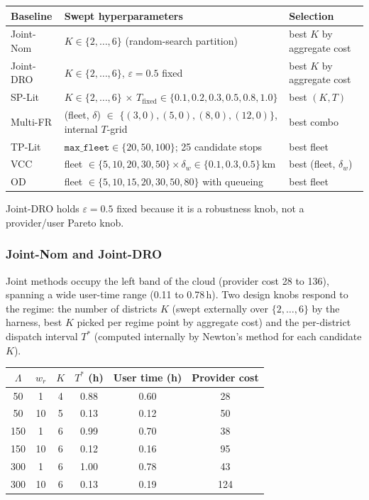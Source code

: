 \begin{center}
\small
\renewcommand{\arraystretch}{1.15}
\begin{tabular}{lll}
\toprule
Baseline & Swept hyperparameters & Selection \\
\midrule
Joint-Nom  & $K \in \{2,\dots,6\}$ (random-search partition) & best $K$ by aggregate cost \\
Joint-DRO  & $K \in \{2,\dots,6\}$, $\varepsilon = 0.5$ fixed & best $K$ by aggregate cost \\
SP-Lit     & $K \in \{2,\dots,6\}$ $\times$ $T_{\mathrm{fixed}} \in \{0.1, 0.2, 0.3, 0.5, 0.8, 1.0\}$ & best $(K, T)$ \\
Multi-FR   & (fleet, $\delta$) $\in$ $\{(3,0), (5,0), (8,0), (12,0)\}$, internal $T$-grid & best combo \\
TP-Lit     & $\mathtt{max\_fleet} \in \{20, 50, 100\}$; 25 candidate stops & best fleet \\
VCC        & fleet $\in \{5,10,20,30,50\} \times \delta_w \in \{0.1, 0.3, 0.5\}$\,km & best (fleet, $\delta_w$) \\
OD         & fleet $\in \{5,10,15,20,30,50,80\}$ with queueing & best fleet \\
\bottomrule
\end{tabular}
\end{center}

Joint-DRO holds $\varepsilon{=}0.5$ fixed because it is a robustness knob, not a provider/user Pareto knob.

\subsubsection{Joint-Nom and Joint-DRO}

Joint methods occupy the left band of the cloud (provider cost 28 to 136), spanning a wide user-time range (0.11 to 0.78\,h). Two design knobs respond to the regime: the number of districts $K$ (swept externally over $\{2,\dots,6\}$ by the harness, best $K$ picked per regime point by aggregate cost) and the per-district dispatch interval $T^*$ (computed internally by Newton's method for each candidate $K$).

\begin{center}
\small
\begin{tabular}{cccccc}
\toprule
$\Lambda$ & $w_r$ & $K$ & $T^*$ (h) & User time (h) & Provider cost \\
\midrule
 50 &  1 & 4 & 0.88 & 0.60 &  28 \\
 50 & 10 & 5 & 0.13 & 0.12 &  50 \\
150 &  1 & 6 & 0.99 & 0.70 &  38 \\
150 & 10 & 6 & 0.12 & 0.16 &  95 \\
300 &  1 & 6 & 1.00 & 0.78 &  43 \\
300 & 10 & 6 & 0.13 & 0.19 & 124 \\
\bottomrule
\end{tabular}
\end{center}

